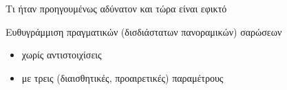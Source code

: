 \begin{frame}{Τι ήταν προηγουμένως αδύνατον και τώρα είναι εφικτό}

  Ευθυγράμμιση πραγματικών (δισδιάστατων πανοραμικών) σαρώσεων
  \begin{itemize}
    \item χωρίς αντιστοιχίσεις
    \item με τρεις (διαισθητικές, προαιρετικές) παραμέτρους
  \end{itemize}



\end{frame}
